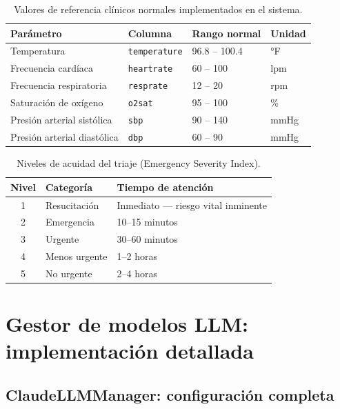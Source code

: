 \begin{table}[H]
\centering
\caption{Valores de referencia clínicos normales implementados en el sistema.}
\label{tab:appendix_vitales}
\footnotesize
\begin{tabularx}{\columnwidth}{llll}
\toprule
\textbf{Parámetro} & \textbf{Columna} & \textbf{Rango normal} & \textbf{Unidad} \\
\midrule
Temperatura & \texttt{temperature} & 96.8 -- 100.4 & °F \\
Frecuencia cardíaca & \texttt{heartrate} & 60 -- 100 & lpm \\
Frecuencia respiratoria & \texttt{resprate} & 12 -- 20 & rpm \\
Saturación de oxígeno & \texttt{o2sat} & 95 -- 100 & \% \\
Presión arterial sistólica & \texttt{sbp} & 90 -- 140 & mmHg \\
Presión arterial diastólica & \texttt{dbp} & 60 -- 90 & mmHg \\
\bottomrule
\end{tabularx}
\end{table}

\begin{table}[H]
\centering
\caption{Niveles de acuidad del triaje (Emergency Severity Index).}
\label{tab:appendix_acuidad}
\footnotesize
\begin{tabularx}{\columnwidth}{clX}
\toprule
\textbf{Nivel} & \textbf{Categoría} & \textbf{Tiempo de atención} \\
\midrule
1 & Resucitación & Inmediato --- riesgo vital inminente \\
2 & Emergencia & 10--15 minutos \\
3 & Urgente & 30--60 minutos \\
4 & Menos urgente & 1--2 horas \\
5 & No urgente & 2--4 horas \\
\bottomrule
\end{tabularx}
\end{table}

\section{Gestor de modelos \acs{LLM}: implementación detallada}
\label{sec:appendix_llm}

\subsection{ClaudeLLMManager: configuración completa}

